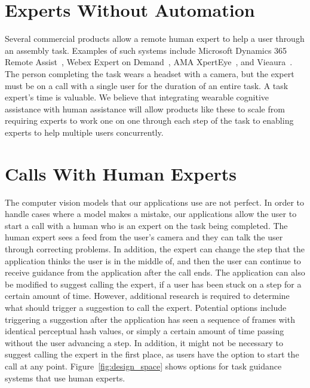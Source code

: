 \pagebreak

\section{Experts Without Automation}

Several commercial products allow a remote human expert to help a user through
an assembly task.
Examples of such systems include Microsoft Dynamics 365 Remote
Assist~\cite{dynamics365}, Webex Expert on Demand~\cite{webex},
AMA XpertEye~\cite{xpert}, and Vieaura~\cite{vieaura}.
The person completing the task wears a headset with a camera, but the expert
must be on a call with a single user for the duration of an entire task.
A task expert's time is valuable.
We believe that integrating wearable cognitive assistance with
human assistance will allow products like these to scale from requiring
experts to work one on one through each step of the task to enabling experts to
help multiple users concurrently.

\section{Calls With Human Experts}

The computer vision models that our applications use are not perfect. In order
to handle cases where a model makes a mistake, our applications allow the user
to start a call with a human who is an expert on the task being completed. The
human expert sees a feed from the user's camera and they can talk the user
through correcting problems. In addition, the expert can change the step that
the application thinks the user is in the middle of, and then the user can
continue to receive guidance from the application after the call ends.
The application can also be modified to suggest calling the expert, if a user
has been stuck on a step for a certain amount of time.
However, additional research is required to determine what should trigger a
suggestion to call the expert.
Potential options include triggering a suggestion after the application has seen
a sequence of frames with identical perceptual hash
values, or simply a certain amount of time passing without the user advancing a
step.
In addition, it might not be necessary to suggest calling the expert in the
first place, as users have the option to start the call at any point.
Figure~\ref{fig:design_space} shows options for task guidance systems that use
human experts.

